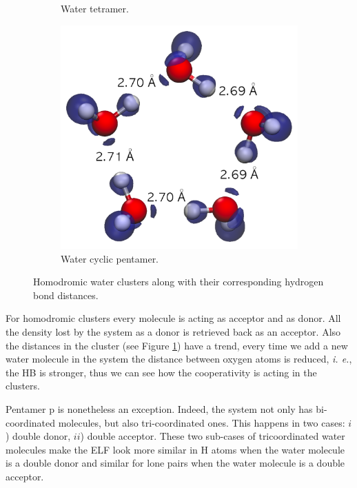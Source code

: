 \begin{figure}[h]
\begin{subfigure}[b]{0.32\linewidth}
    \caption{Water tetramer.}
  \end{subfigure}
  \begin{subfigure}[b]{0.32\linewidth}
    \includegraphics[width=\linewidth]{4/plots/elf/new/pentamer_cELF}
    \caption{Water cyclic pentamer.}
  \end{subfigure}
  \caption{Homodromic water clusters along with their corresponding hydrogen bond distances.}
  \label{homodromic}
\end{figure}

For homodromic clusters every molecule is acting as acceptor and as donor.  All
the density lost by the system as a donor is retrieved back as an acceptor.
Also the distances in the cluster (see Figure \ref{homodromic}) have a trend,
every time we add a new water molecule in the system the distance between
oxygen atoms is reduced, \textit{i. e.}, the HB is stronger, thus we can see
how the cooperativity is acting in the clusters.

\newpage

Pentamer p is nonetheless an exception. Indeed, the system not only has
bi-coordinated molecules, but also tri-coordinated ones. This happens in two
cases: $i$) double donor, $ii$) double acceptor.  These two sub-cases of
tricoordinated water molecules make the ELF look more similar in H atoms when
the water molecule is a double donor and similar for lone pairs when the water
molecule is a double acceptor.

